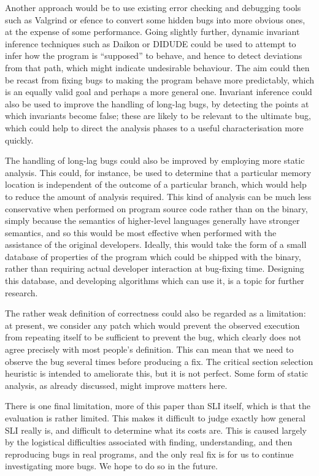 \documentclass[10pt,a4paper,twocolumn]{article}
\begin{document}
Another approach would be to use existing error checking and debugging
tools such as Valgrind\cite{Nethercote2007} or efence\needCite{} to
convert some hidden bugs into more obvious ones, at the expense of
some performance.  Going slightly further, dynamic invariant inference
techniques such as Daikon or DIDUDE could be used to attempt to infer
how the program is ``supposed'' to behave, and hence to detect
deviations from that path, which might indicate undesirable behaviour.
The aim could then be recast from fixing bugs to making the program
behave more predictably, which is an equally valid goal and perhaps a
more general one.  Invariant inference could also be used to improve
the handling of long-lag bugs, by detecting the points at which
invariants become false; these are likely to be relevant to the
ultimate bug, which could help to direct the analysis phases to a
useful characterisation more quickly.

The handling of long-lag bugs could also be improved by employing more
static analysis.  This could, for instance, be used to determine that
a particular memory location is independent of the outcome of a
particular branch, which would help to reduce the amount of analysis
required.  This kind of analysis can be much less conservative when
performed on program source code rather than on the binary, simply
because the semantics of higher-level languages generally have
stronger semantics, and so this would be most effective when performed
with the assistance of the original developers.  Ideally, this would
take the form of a small database of properties of the program which
could be shipped with the binary, rather than requiring actual
developer interaction at bug-fixing time.  Designing this database,
and developing algorithms which can use it, is a topic for further
research.

The rather weak definition of correctness could also be regarded as a
limitation: at present, we consider any patch which would prevent the
observed execution from repeating itself to be sufficient to prevent
the bug, which clearly does not agree precisely with most people's
definition.  This can mean that we need to observe the bug several
times before producing a fix.  The critical section selection
heuristic is intended to ameliorate this, but it is not perfect.  Some
form of static analysis, as already discussed, might improve matters
here.

There is one final limitation, more of this paper than SLI itself,
which is that the evaluation is rather limited.  This makes it
difficult to judge exactly how general SLI really is, and difficult to
determine what its costs are.  This is caused largely by the
logistical difficulties associated with finding, understanding, and
then reproducing bugs in real programs, and the only real fix is for
us to continue investigating more bugs.  We hope to
do so in the future.
\end{document}
